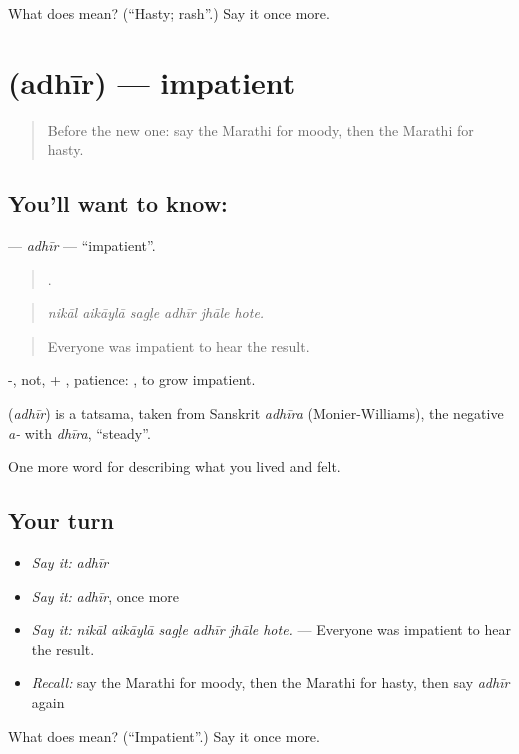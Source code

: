 \begin{tcolorbox}[breakable,colback=teal!4,colframe=teal!35!black,title={Before you move on}]
What does  mean? (\textquotedblleft{}Hasty; rash\textquotedblright{}.) Say it once more.
\end{tcolorbox}
\section[\texorpdfstring{\mr{अधीर} (adhīr)}{अधीर (adhīr)}]{ (adhīr) — impatient}

\label{lesson:MR-C472-adhir}



\begin{quote}
Before the new one: say the Marathi for moody, then the Marathi for hasty.
\end{quote}

\subsection*{You'll want to know: }
\textbf{} — \emph{adhīr} — \textquotedblleft{}impatient\textquotedblright{}.

\begin{quote}
     .
\end{quote}

\begin{quote}
\emph{nikāl aikāylā sagḷe adhīr jhāle hote.}
\end{quote}

\begin{quote}
Everyone was impatient to hear the result.
\end{quote}

-, not, + , patience:  , to grow impatient.

\begin{cousinweb}
\textbf{} (\emph{adhīr}) is a tatsama, taken from Sanskrit \emph{adhīra} (Monier-Williams), the negative \emph{a-} with \emph{dhīra}, \textquotedblleft{}steady\textquotedblright{}.
\end{cousinweb}

\begin{grammarlens}[title={What you've built}]
One more word for describing what you lived and felt.
\end{grammarlens}

\subsection*{Your turn}
\begin{itemize}
\raggedright
  \item \emph{Say it:} \emph{adhīr}
  \item \emph{Say it:} \emph{adhīr}, once more
  \item \emph{Say it:} \emph{nikāl aikāylā sagḷe adhīr jhāle hote.} — Everyone was impatient to hear the result.
  \item \emph{Recall:} say the Marathi for moody, then the Marathi for hasty, then say \emph{adhīr} again
\end{itemize}

\begin{tcolorbox}[breakable,colback=teal!4,colframe=teal!35!black,title={Before you move on}]
What does  mean? (\textquotedblleft{}Impatient\textquotedblright{}.) Say it once more.
\end{tcolorbox}
